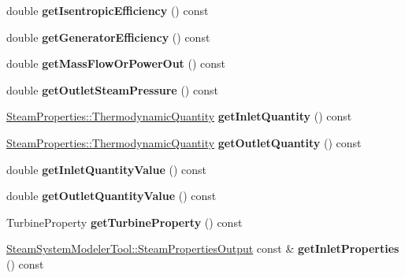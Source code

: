 \begin{DoxyCompactItemize}
double {\bfseries get\+Isentropic\+Efficiency} () const
\item 
\mbox{\label{class_turbine_a92266fd994310d1842ba37c05bc40bf8}} 
double {\bfseries get\+Generator\+Efficiency} () const
\item 
\mbox{\label{class_turbine_a820a090d264b96ee84f717555545c287}} 
double {\bfseries get\+Mass\+Flow\+Or\+Power\+Out} () const
\item 
\mbox{\label{class_turbine_a1589b2364a553db7aaa875bb543d171d}} 
double {\bfseries get\+Outlet\+Steam\+Pressure} () const
\item 
\mbox{\label{class_turbine_ac9e91d9539cea5cd1e0037c397c28c78}} 
\hyperlink{class_steam_properties_ae0294bedf7d178c2d8fb6aed0f62fbff}{Steam\+Properties\+::\+Thermodynamic\+Quantity} {\bfseries get\+Inlet\+Quantity} () const
\item 
\mbox{\label{class_turbine_acd3e98ab67754b652de97498d9bec6d2}} 
\hyperlink{class_steam_properties_ae0294bedf7d178c2d8fb6aed0f62fbff}{Steam\+Properties\+::\+Thermodynamic\+Quantity} {\bfseries get\+Outlet\+Quantity} () const
\item 
\mbox{\label{class_turbine_a3d8a3f317fa71abb3404144371615725}} 
double {\bfseries get\+Inlet\+Quantity\+Value} () const
\item 
\mbox{\label{class_turbine_aca98f128213e02e95dfd6f4b2ad8de4e}} 
double {\bfseries get\+Outlet\+Quantity\+Value} () const
\item 
\mbox{\label{class_turbine_a14f6eff49b501aa8c5a22d404dbeaac0}} 
Turbine\+Property {\bfseries get\+Turbine\+Property} () const
\item 
\mbox{\label{class_turbine_a7a906cf74affed9acfa4045964eccbf6}} 
\hyperlink{struct_steam_system_modeler_tool_1_1_steam_properties_output}{Steam\+System\+Modeler\+Tool\+::\+Steam\+Properties\+Output} const  \& {\bfseries get\+Inlet\+Properties} () const
\item 
\mbox{\label{class_turbine_aa9449622449e78285a258823ff77c8ec}} 

\end{DoxyCompactItemize}
